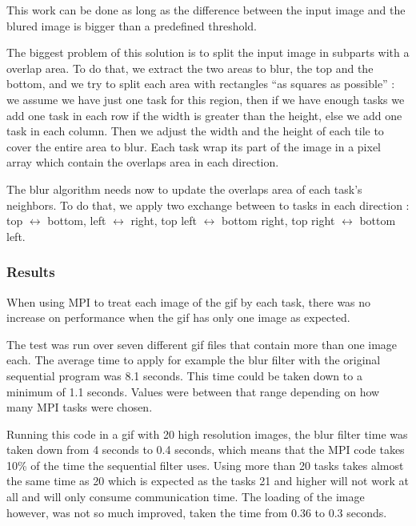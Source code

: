 \documentclass[conference,compsoc]{IEEEtran}
\begin{document}
This work can be done as long as the difference between the input image and the blured image is bigger than a predefined threshold.

The biggest problem of this solution is to split the input image in subparts with a overlap area. To do that, we extract the two areas to blur, the top and the bottom, and we try to split each area with rectangles ``as squares as possible'' : we assume we have just one task for this region, then if we have enough tasks we add one task in each row if the width is greater than the height, else we add one task in each column.
Then we adjust the width and the height of each tile to cover the entire area to blur. Each task wrap its part of the image in a pixel array which contain the overlaps area in each direction.

The blur algorithm needs now to update the overlaps area of each task's neighbors. To do that, we apply two exchange between to tasks in each direction : top $\leftrightarrow$ bottom, left $\leftrightarrow$ right, top left $\leftrightarrow$ bottom right, top right $\leftrightarrow$ bottom left.


\subsubsection{Results}
When using MPI to treat each image of the gif by each task, there was no increase on performance when the gif has only one image as expected. 

The test was run over seven different gif files that contain more than one image each. The average time to apply for example the blur filter with the original sequential program was 8.1 seconds. This time could be taken down to a minimum of 1.1 seconds. Values were between that range depending on how many MPI tasks were chosen.

Running this code in a gif with 20 high resolution images, the blur filter time was taken down from 4 seconds to 0.4 seconds, which means that the MPI code takes 10\% of the time the sequential filter uses. Using more than 20 tasks takes almost the same time as 20 which is expected as the tasks 21 and higher will not work at all and will only consume communication time.
The loading of the image however, was not so much improved, taken the time from 0.36 to 0.3 seconds.
\end{document}

